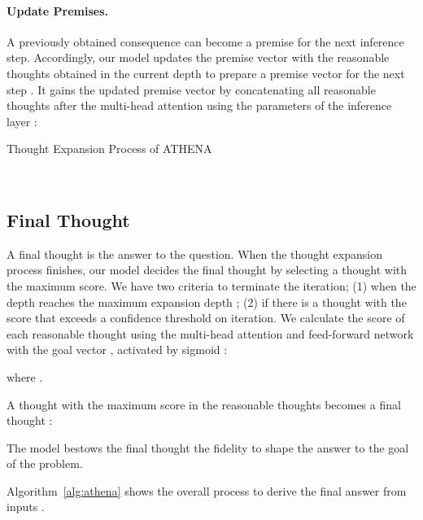 \documentclass[11pt]{article}
\newcommand{\1}{\mathbb{1}}
\begin{document}
\paragraph{Update Premises.}
A previously obtained consequence can become a premise for the next inference step.
Accordingly, our model updates the premise vector  with the reasonable thoughts  obtained in the current depth  to prepare a premise vector for the next step .
It gains the updated premise vector by concatenating all reasonable thoughts  after the multi-head attention  using the parameters of the inference layer :



\begin{algorithm}[t]
\renewcommand{\algorithmicrequire}{\textbf{Input:}}
\renewcommand{\algorithmicensure}{\textbf{Output:}}
\small
\caption{\small Thought Expansion Process of ATHENA}\label{alg:athena}
\begin{algorithmic}
\Require 
\Ensure 
\State 
\State  
\While{}
\State 
\State 
\If{} \State 
\ElsIf{} \State 
\EndIf
\State 
\EndWhile
\State  \\
\Return 
\end{algorithmic}
\end{algorithm}


\subsection{Final Thought}
\label{sec:final}

A final thought  is the answer to the question.
When the thought expansion process finishes, our model decides the final thought by selecting a thought with the maximum score.
We have two criteria to terminate the iteration;
(1) when the depth reaches the maximum expansion depth ;
(2) if there is a thought with the score that exceeds a confidence threshold  on iteration.
We calculate the score of each reasonable thought   using the multi-head attention  and feed-forward network  with the goal vector , activated by sigmoid :

where .

A thought with the maximum score in the reasonable thoughts becomes a final thought : 

The model bestows the final thought the fidelity to shape the answer to the goal of the problem.

Algorithm~\ref{alg:athena}
shows the overall process to derive the final answer  from inputs .
\end{document}
